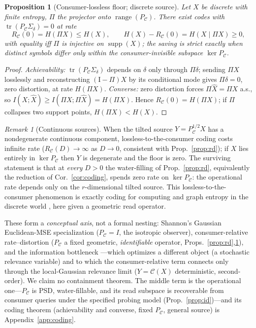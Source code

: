 \documentclass[11pt]{article}
\newtheorem{proposition}{Proposition}
\theoremstyle{definition}
\theoremstyle{remark}
\newtheorem*{remark}{Remark}
\newcommand{\PC}{P_{\mathcal{C}}}
\newcommand{\Sd}{\Sigma_{\delta}}
\newcommand{\tr}{\operatorname{tr}}
\begin{document}
\begin{proposition}[Consumer-lossless floor; discrete source]\label{prop:floor}
Let $X$ be discrete with finite entropy, $\Pi$ the projector onto
$\operatorname{range}(\PC)$. There exist codes with $\tr(\PC\Sd)=0$ at rate
\[
R_{\mathcal{C}}(0)=H(\Pi X)\le H(X),\qquad H(X)-R_{\mathcal{C}}(0)=H(X\mid\Pi X)\ge0,
\]
with equality iff $\Pi$ is injective on $\operatorname{supp}(X)$; the saving is
strict exactly when distinct symbols differ only within the consumer-invisible
subspace $\ker\PC$.
\end{proposition}
\begin{proof}
\emph{Achievability:} $\tr(\PC\Sd)$ depends on $\delta$ only through $\Pi\delta$;
sending $\Pi X$ losslessly and reconstructing $(\mathrm I-\Pi)X$ by its conditional
mode gives $\Pi\delta=0$, zero distortion, at rate $H(\Pi X)$. \emph{Converse:} zero
distortion forces $\Pi\hat X=\Pi X$ a.s., so $I(X;\hat X)\ge I(\Pi X;\Pi\hat X)=
H(\Pi X)$. Hence $R_{\mathcal{C}}(0)=H(\Pi X)$; if $\Pi$ collapses two support points,
$H(\Pi X)<H(X)$.
\end{proof}
\begin{remark}[Continuous sources]
When the tilted source $Y=\PC^{1/2}X$ has a nondegenerate continuous component,
lossless-to-the-consumer coding costs infinite rate ($R_{\mathcal{C}}(D)\to\infty$ as
$D\to0$, consistent with Prop.~\ref{prop:rd}); if $X$ lies entirely in $\ker\PC$ then
$Y$ is degenerate and the floor is zero. The surviving statement is
that at \emph{every} $D>0$ the water-filling of Prop.~\ref{prop:rd}, equivalently the
reduction of Cor.~\ref{cor:coding}, spends zero rate on $\ker\PC$: the operational
rate depends only on the $r$-dimensional tilted source. This lossless-to-the-consumer
phenomenon is exactly coding for computing and graph entropy in the discrete world
\cite{korner1973,orlitsky2001}, here given a geometric read operator.
\end{remark}

These form a \emph{conceptual axis}, not a formal nesting: Shannon's Gaussian
Euclidean-MSE specialization ($\PC=I$, the isotropic observer), consumer-relative
rate--distortion ($\PC$ a fixed
geometric, \emph{identifiable} operator, Props.~\ref{prop:rd},\ref{prop:floor}), and
the information bottleneck \cite{tishby1999}---which optimizes a different object (a
stochastic relevance variable) and to which the consumer-relative term connects only
through the local-Gaussian relevance limit ($Y=\mathcal{C}(X)$ deterministic,
second-order). We claim no containment theorem. The middle term is the operational
one---$\PC$ is PSD, water-fillable, and its read subspace is recoverable from consumer
queries under the specified probing model (Prop.~\ref{prop:id})---and its coding
theorem (achievability and converse, fixed
$\PC$, general source) is Appendix~\ref{app:coding}.
\end{document}
